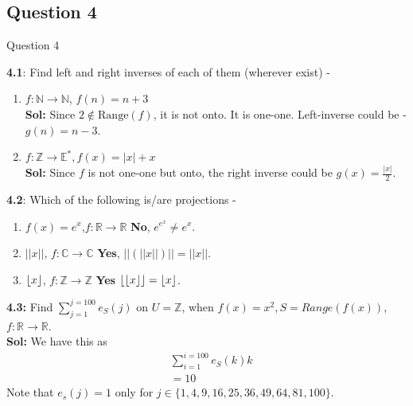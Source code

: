 \documentclass[xcolor=svgnames]{beamer}
\DeclarePairedDelimiter\floor{\lfloor}{\rfloor}
\begin{document}
\subsection{Question 4}
\begin{frame}{Question 4}


\footnotesize{
\begin{multicols}{2}

    \textbf{4.1}: Find left and right inverses of each of them (wherever exist) - 
    \begin{enumerate}
        \item $f: \mathbb{N} \rightarrow \mathbb{N}$, $f(n) = n + 3$
        \\ \textbf{Sol:} Since $2 \notin \text{Range}(f)$, it is not onto. It is one-one. Left-inverse could be - $g(n) =  n - 3$.
        \item $f: \mathbb{Z} \rightarrow \mathbb{E}^*, f(x) = |x| +  x$
        \\ \textbf{Sol:} Since $f$ is not one-one but onto, the right inverse could be $g(x) = \frac{|x|}{2}$.
    \end{enumerate}
    \textbf{4.2}: Which of the following is/are projections - 
    \begin{enumerate}
        \item $f(x) = e^x$,$f: \mathbb{R} \rightarrow \mathbb{R}$ \textbf{No}, $e^{e^x} \neq e^x$.
        \item $||x||$, $f: \mathbb{C} \rightarrow \mathbb{C}$ \textbf{Yes}, $||(||x||)|| = ||x||$.
        \item $\floor{x}$, $f: \mathbb{Z} \rightarrow \mathbb{Z}$ \textbf{Yes} $\floor{\floor{x}} = \floor{x}$.
    \end{enumerate}
    \textbf{4.3:} Find $\sum_{j = 1}^{j = 100} e_{S}(j)$ on $U = \mathbb{Z}$, when $f(x) = x^2,S = Range(f(x))$,$f: \mathbb{R} \rightarrow \mathbb{R}$.
    \\ \textbf{Sol:} We have this as 
    \begin{align*}
        & \sum_{i = 1}^{i=100} e_S(k) k 
        \\ &= 10
    \end{align*}
    Note that $e_s(j) = 1$ only for $j \in \{1,4,9,16,25,36,49,64,81,100\}$.
\end{multicols}    
}
\end{frame}
\end{document}
